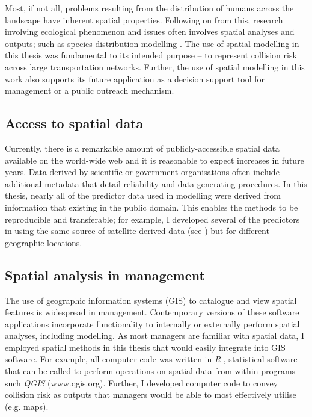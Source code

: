 Most, if not all, problems resulting from the distribution of humans across the landscape have inherent spatial properties. Following on from this, research involving ecological phenomenon and issues often involves spatial analyses and outputs; such as species distribution modelling \citep[e.g.][]{elit09}. The use of spatial modelling in this thesis was fundamental to its intended purpose -- to represent collision risk across large transportation networks. Further, the use of spatial modelling in this work also supports its future application as a decision support tool for management or a public outreach mechanism.

\subsection{Access to spatial data}

Currently, there is a remarkable amount of publicly-accessible spatial data available on the world-wide web \citep{ma15} and it is reasonable to expect increases in future years. Data derived by scientific or government organisations often include additional metadata that detail reliability and data-generating procedures. In this thesis, nearly all of the predictor data used in modelling were derived from information that existing in the public domain. This enables the methods to be reproducible and transferable; for example, I developed several of the predictors in  using the same source of satellite-derived data (see ) but for different geographic locations.

\subsection{Spatial analysis in management}

The use of geographic information systems (GIS) to catalogue and view spatial features is widespread in management. Contemporary versions of these software applications incorporate functionality to internally or externally perform spatial analyses, including modelling. As most managers are familiar with spatial data, I employed spatial methods in this thesis that would easily integrate into GIS software. For example, all computer code was written in \textit{R} \citep{rdct16}, statistical software that can be called to perform operations on spatial data from within programs such \textit{QGIS} (www.qgis.org). Further, I developed computer code to convey collision risk as outputs that managers would be able to most effectively utilise (e.g. maps).

